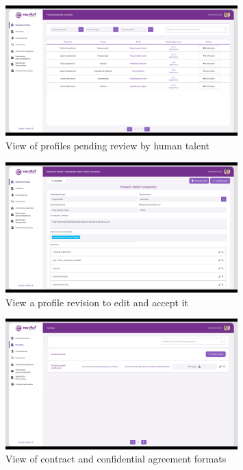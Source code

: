 \documentclass{scrreprt}
\begin{document}
\begin{figure}[H]
	\centering \small
	\includegraphics[width=0.8\textwidth]{WebPrototype/wflow-22.jpeg}
	\caption{View of profiles pending review by human talent}
\end{figure}

\begin{figure}[H]
	\centering \small
	\includegraphics[width=0.8\textwidth]{WebPrototype/wflow-23.jpeg}
	\caption{View a profile revision to edit and accept it}
\end{figure}

\begin{figure}[H]
	\centering \small
	\includegraphics[width=0.8\textwidth]{WebPrototype/wflow-24.jpeg}
	\caption{View of contract and confidential agreement formats}
\end{figure}
\end{document}
